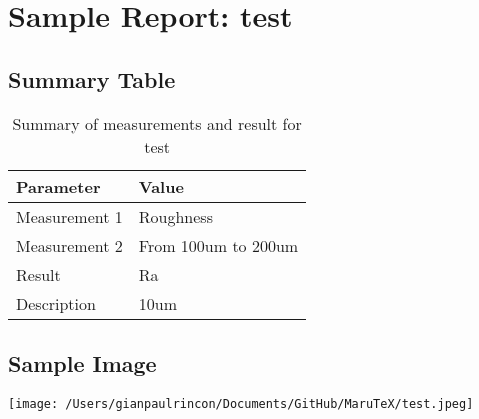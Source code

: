 \documentclass[a4paper,12pt]{article}
\begin{document}
    \section*{Sample Report: test}

    \subsection*{Summary Table}
    \begin{table}[h!]
    \centering
    \begin{tabular}{|l|l|}
    \hline
    \textbf{Parameter} & \textbf{Value} \\ \hline
    Measurement 1 & Roughness \\ \hline
    Measurement 2 & From 100um to 200um \\ \hline
    Result & Ra \\ \hline
    Description & 10um \\ \hline
    \end{tabular}
    \caption{Summary of measurements and result for test}
    \end{table}

    \subsection*{Sample Image}
    \texttt{[image: /Users/gianpaulrincon/Documents/GitHub/MaruTeX/test.jpeg]}

    
\end{document}
